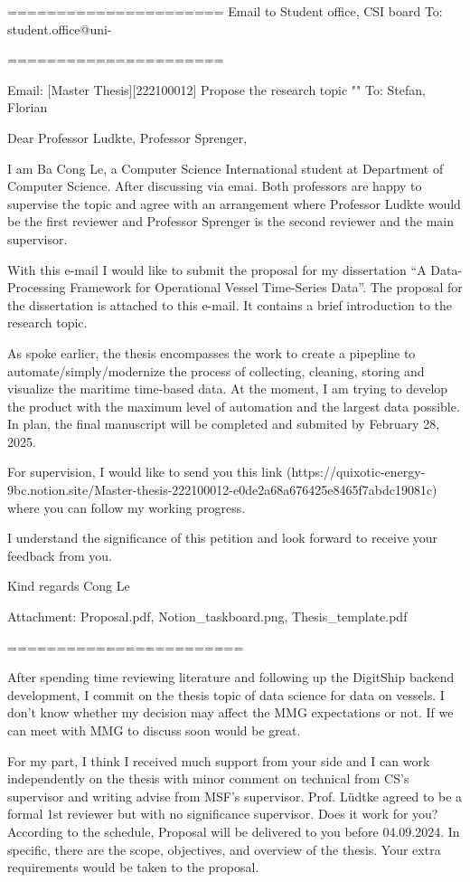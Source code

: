 
======================
Email to Student office, CSI board
To: student.office@uni-



======================

Email: [Master Thesis][222100012] Propose the research topic ""
To: Stefan, Florian

Dear Professor Ludkte, Professor Sprenger,

I am Ba Cong Le, a Computer Science International student at Department of Computer Science.
After discussing via emai. Both professors are happy to supervise the topic and agree with an arrangement where Professor Ludkte would be the first reviewer and Professor Sprenger is the second reviewer and the main supervisor.

With this e-mail I would like to submit the proposal for my dissertation “A Data-Processing Framework for Operational Vessel Time-Series Data”. The proposal for the dissertation is attached to this e-mail. It contains a brief introduction to the research topic. 

As spoke earlier, the thesis encompasses the work to create a pipepline to automate/simply/modernize the process of collecting, cleaning, storing and visualize the maritime time-based data. At the moment, I am trying to develop the product with the maximum level of automation and the largest data possible. In plan, the final manuscript will be completed and submited by February 28, 2025.

For supervision, I would like to send you this link (https://quixotic-energy-9bc.notion.site/Master-thesis-222100012-e0de2a68a676425e8465f7abdc19081c) where you can follow my working progress.

I understand the significance of this petition and look forward to receive your feedback from you.

Kind regards
Cong Le

Attachment: Proposal.pdf, Notion_taskboard.png, Thesis_template.pdf


========================

After spending time reviewing literature and following up the DigitShip backend development, I commit on the thesis topic of data science for data on vessels.
I don't know whether my decision may affect the MMG expectations or not. If we can meet with MMG to discuss soon would be great.

For my part, I think I received much support from your side and I can work independently on the thesis with minor comment on technical from CS's supervisor and writing advise from MSF's supervisor. Prof. Lüdtke agreed to be a formal 1st reviewer but with no significance supervisor. Does it work for you?
According to the schedule, Proposal will be delivered to you before 04.09.2024. In specific, there are the scope, objectives, and overview of the thesis. Your extra requirements would be taken to the proposal.




